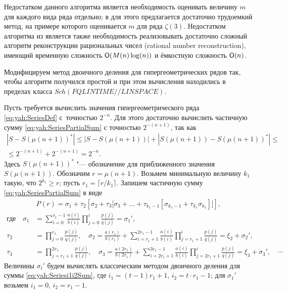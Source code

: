 Недостатком данного алгоритма является необходимость оценивать
величину $m$ для каждого вида ряда отдельно; в \cite{yakhontov:bib:Cheng}
для этого предлагается достаточно трудоемкий метод, на примере
которого оценивается $m$ для ряда $\zeta(3)$. Недостатком алгоритма
из \cite{yakhontov:bib:Cheng} является также необходимость реализовывать
достаточно сложный алгоритм реконструкции рациональных чисел
(rational number reconstruction), имеющий временную сложность
${\sf O}(M(n)\log(n))$ и ёмкостную сложность ${\sf O}(n)$.

\smallskip

Модифицируем метод двоичного деления для гипергеометрических рядов
так, чтобы алгоритм получился простой и при этом вычисления находились в
пределах класса $Sch(FQLINTIME//LINSPACE)$.

Пусть требуется вычислить значения гипергеометрического ряда
\eqref{eq:yah:SeriesDef} с~точностью $2^{-n}$. Для этого достаточно
вычислить частичную сумму \eqref{eq:yah:SeriesPartialSum} с точностью
$2^{-(n+1)}$, так как
%
\begin{multline*}
|S-S(\mu(n+1))^*|
\le|S-S(\mu(n+1))|+|S(\mu(n+1))-S(\mu(n+1))^*|\le \\
\le 2^{-(n+1)}+2^{-(n+1)}=2^{-n}.
\end{multline*}
Здесь $S(\mu(n+1))^*$ "--- обозначение для приближенного значения
$S(\mu(n+1))$.
%
Обозначим $r=\mu(n+1)$. Возьмем минимальную величину $k_1$ такую, что
$2^{k_1}\ge r$; пусть $r_1=\lceil{r}/{k_1}\rceil$. Запишем
частичную сумму \eqref{eq:yah:SeriesPartialSum} в виде
\begin{align}
P(r)
=\sigma_1+\tau_2\left[\sigma_2+\tau_3\big[\sigma_3+\ldots+
\tau_{k_1-1}[\sigma_{k_1-1}+\tau_{k_1}\sigma_{k_1}]\big]\right],
\label{eq:yah:PmukEquation}
\end{align}
\begin{align*}
\text{где}	\quad  \sigma_1&=
\sum_{i=0}^{r_1-1}{\frac{a(i)}{b(i)}
\prod_{j=0}^{i}{\frac{p(j)}{q(j)}}}=\sigma_1',\\
%
\tau_2&=
\prod_{j=0}^{r_1}{\frac{p(j)}{q(j)}},\quad
\sigma_2=
\frac{a(r_1)}{b(r_1)}+
\sum_{i=r_1+1}^{2r_1-1}{\frac{a(i)}{b(i)}
\prod_{j=r_1+1}^{i}{\frac{p(j)}{q(j)}}}
=\xi_2+\sigma_2',
\\
%
\tau_3&=
\prod_{j=r_1+1}^{2r_1}{\frac{p(j)}{q(j)}},\quad
\sigma_3=
\frac{a(2r_1)}{b(2r_1)}+
\sum_{i=2r_1+1}^{3r_1-1}{\frac{a(i)}{b(i)}
\prod_{j=2r_1+1}^{i}{\frac{p(j)}{q(j)}}}
=\xi_3+\sigma_3', \quad \cdots
\end{align*}
%
Величины $\sigma_t'$ будем вычислять классическим методом двоичного деления
для суммы \eqref{eq:yah:Seriesi1i2Sum}, где $i_1=(t-1)r_1+1$,
$i_2=t\cdot r_1-1$; для $\sigma_1'$ возьмем $i_1=0$, $i_2=r_1-1$.

